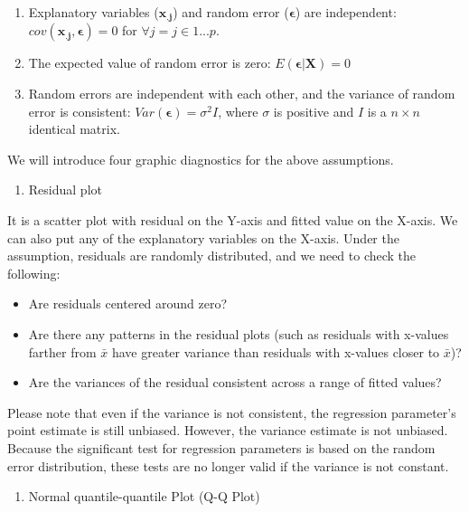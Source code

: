 \documentclass[12pt,]{krantz}
\providecommand{\tightlist}{%
  \setlength{\itemsep}{0pt}\setlength{\parskip}{0pt}}
\begin{document}
\begin{enumerate}
\def\labelenumi{\arabic{enumi}.}
\item
  Explanatory variables (\(\mathbf{x_{.j}}\)) and random error (\(\symbf{\epsilon}\)) are independent: \(cov(\mathbf{x_{.j},\epsilon})=0\) for \(\forall j=j\in1...p\).
\item
  The expected value of random error is zero: \(E(\symbf{\epsilon|X})=0\)
\item
  Random errors are independent with each other, and the variance of random error is consistent: \(Var(\symbf{\epsilon})=\sigma^{2}I\), where \(\sigma\) is positive and \(I\) is a \(n \times n\) identical matrix.
\end{enumerate}

We will introduce four graphic diagnostics for the above assumptions.

\begin{enumerate}
\def\labelenumi{(\arabic{enumi})}
\tightlist
\item
  Residual plot 
\end{enumerate}

It is a scatter plot with residual on the Y-axis and fitted value on the X-axis. We can also put any of the explanatory variables on the X-axis. Under the assumption, residuals are randomly distributed, and we need to check the following:

\begin{itemize}
\tightlist
\item
  Are residuals centered around zero?
\item
  Are there any patterns in the residual plots (such as residuals with x-values farther from \(\bar{x}\) have greater variance than residuals with x-values closer to \(\bar{x}\))?
\item
  Are the variances of the residual consistent across a range of fitted values?
\end{itemize}

Please note that even if the variance is not consistent, the regression parameter's point estimate is still unbiased. However, the variance estimate is not unbiased. Because the significant test for regression parameters is based on the random error distribution, these tests are no longer valid if the variance is not constant.

\begin{enumerate}
\def\labelenumi{(\arabic{enumi})}
\setcounter{enumi}{1}
\tightlist
\item
  Normal quantile-quantile Plot (Q-Q Plot) 
\end{enumerate}
\end{document}
